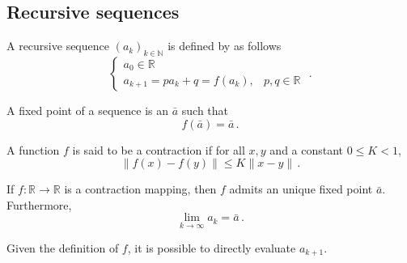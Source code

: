 \subsection{Recursive sequences}\label{sec:recursive-sequence}
%
A recursive sequence $(a_k)_{k \in \mathbb N}$ is defined by as follows
\begin{equation} \label{eq:gen-rec-seq}
    \begin{cases}
        a_0 \in \mathbb R \\
        a_{k+1} = p a_k + q = f(a_k), & p, q \in \mathbb R \,
    \end{cases} \, .
\end{equation}

\begin{definition}
A fixed point of a sequence is an $\bar a$ such that
\begin{equation*}
    f(\bar a) = \bar a \, .
\end{equation*}
\end{definition}

\begin{definition}\label{def:contraction-mapping}
   A function $f$ is said to be a contraction if for all $x, y$ and a constant
   $0 \leq K < 1$,
   \begin{equation*}
    \| f(x)-f(y) \| \leq K \| x - y \| \, .
   \end{equation*}
\end{definition}

\begin{theorem}\label{thm:banach-fixed-point}
If $f: \mathbb R \rightarrow \mathbb R$ is a contraction mapping, then $f$
admits an unique fixed point $\bar a$. Furthermore,
\begin{equation*}
    \lim_{k\rightarrow \infty} a_k = \bar a \, .
\end{equation*}
\end{theorem}

Given the definition of $f$, it is possible to directly evaluate $a_{k+1}$.

